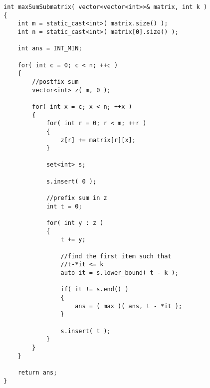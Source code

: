 \setcounter{lstlisting}{0}
\begin{lstlisting}[style=customc, caption={2D Kadane}]
int maxSumSubmatrix( vector<vector<int>>& matrix, int k )
{
    int m = static_cast<int>( matrix.size() );
    int n = static_cast<int>( matrix[0].size() );

    int ans = INT_MIN;

    for( int c = 0; c < n; ++c )
    {
        //postfix sum
        vector<int> z( m, 0 );

        for( int x = c; x < n; ++x )
        {
            for( int r = 0; r < m; ++r )
            {
                z[r] += matrix[r][x];
            }

            set<int> s;

            s.insert( 0 );

            //prefix sum in z
            int t = 0;

            for( int y : z )
            {
                t += y;

                //find the first item such that
                //t-*it <= k
                auto it = s.lower_bound( t - k );

                if( it != s.end() )
                {
                    ans = ( max )( ans, t - *it );
                }

                s.insert( t );
            }
        }
    }

    return ans;
}
\end{lstlisting}